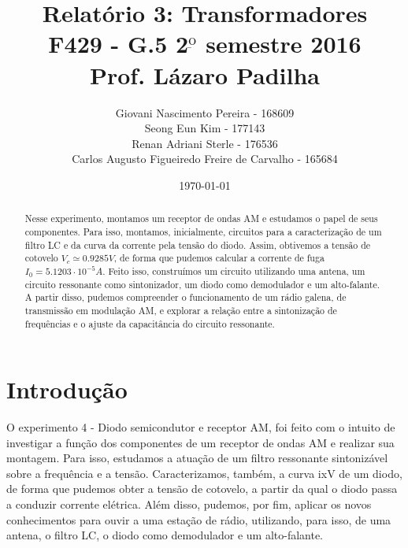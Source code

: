 \documentclass[11pt,a4paper]{article}
\begin{document}
\title{Relatório 3: Transformadores\\
\small{F429 - G.5  2$^{ \underbar{\text{o}} }$ semestre 2016 \\
Prof. Lázaro Padilha }}
\author{Giovani Nascimento Pereira - 168609 \\
Seong Eun Kim - 177143\\
Renan Adriani Sterle - 176536\\
Carlos Augusto Figueiredo Freire de Carvalho - 165684}

\date{\today}
%
%
\maketitle
\begin{abstract}
    Nesse experimento, montamos um receptor de ondas AM e estudamos o papel de seus componentes. Para isso, montamos, inicialmente, circuitos para a caracterização de um filtro LC e da curva da corrente pela tensão do diodo. Assim, obtivemos a tensão de cotovelo $V_c \simeq 0.9285 V$, de forma que pudemos calcular a corrente de fuga $I_0 = 5.1203\cdot10^{-5} A$. Feito isso, construímos um circuito utilizando uma antena, um circuito ressonante como sintonizador, um diodo como demodulador e um alto-falante. A partir disso, pudemos compreender o funcionamento de um rádio galena, de transmissão em modulação AM, e explorar a relação entre a sintonização de frequências e o ajuste da capacitância do circuito ressonante.
\end{abstract}

\newpage %
\tableofcontents %
%
%
\newpage
\section{Introdução}
    O experimento 4 - Diodo semicondutor e receptor AM, foi feito com o intuito de investigar a função dos componentes de um receptor de ondas AM e realizar sua montagem. Para isso, estudamos a atuação de um filtro ressonante sintonizável sobre a frequência e a tensão. Caracterizamos, também, a curva ixV de um diodo, de forma que pudemos obter a tensão de cotovelo, a partir da qual o diodo passa a conduzir corrente elétrica. Além disso, pudemos, por fim, aplicar os novos conhecimentos para ouvir a uma estação de rádio, utilizando, para isso, de uma antena, o filtro LC, o diodo como demodulador e um alto-falante.
    
\end{document}
